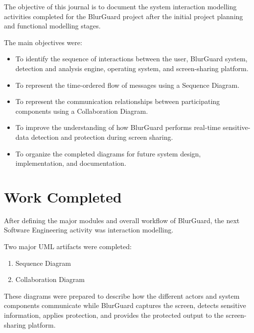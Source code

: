 \documentclass[12pt,a4paper]{article}
\begin{document}
The objective of this journal is to document the system interaction modelling activities completed for the BlurGuard project after the initial project planning and functional modelling stages.

The main objectives were:

\begin{itemize}[leftmargin=1.4em]
    \item To identify the sequence of interactions between the user, BlurGuard system, detection and analysis engine, operating system, and screen-sharing platform.
    
    \item To represent the time-ordered flow of messages using a Sequence Diagram.
    
    \item To represent the communication relationships between participating components using a Collaboration Diagram.
    
    \item To improve the understanding of how BlurGuard performs real-time sensitive-data detection and protection during screen sharing.
    
    \item To organize the completed diagrams for future system design, implementation, and documentation.
\end{itemize}



\section{Work Completed}

After defining the major modules and overall workflow of BlurGuard, the next Software Engineering activity was interaction modelling.

Two major UML artifacts were completed:

\begin{enumerate}[leftmargin=1.6em]
    \item Sequence Diagram
    \item Collaboration Diagram
\end{enumerate}

These diagrams were prepared to describe how the different actors and system components communicate while BlurGuard captures the screen, detects sensitive information, applies protection, and provides the protected output to the screen-sharing platform.
\end{document}
